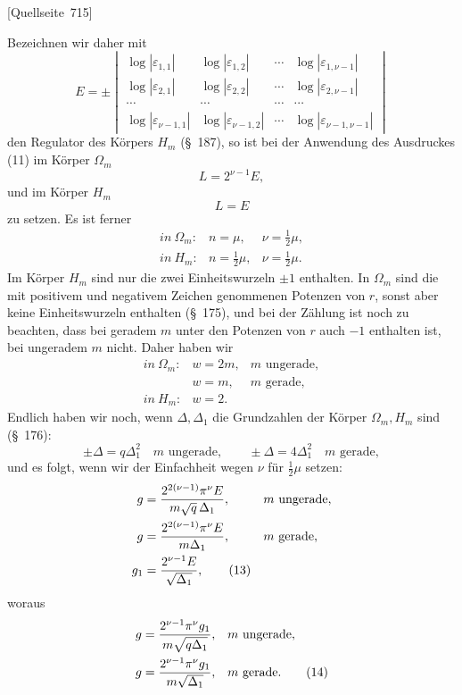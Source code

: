\documentclass[11pt]{article}
\newcommand{\eps}{\varepsilon}
\newcommand{\srcpage}[1]{\par\medskip\noindent\textsf{[Quellseite~#1]}\par\smallskip}
\begin{document}
\srcpage{715}
Bezeichnen wir daher mit
\begin{equation}
E=\pm\begin{vmatrix}
\log|\eps_{1,1}|&\log|\eps_{1,2}|&\cdots&\log|\eps_{1,\nu-1}|\\
\log|\eps_{2,1}|&\log|\eps_{2,2}|&\cdots&\log|\eps_{2,\nu-1}|\\
\cdots&\cdots&\cdots&\cdots\\
\log|\eps_{\nu-1,1}|&\log|\eps_{\nu-1,2}|&\cdots&\log|\eps_{\nu-1,\nu-1}|
\end{vmatrix}
\tag{12}
\end{equation}
den Regulator des Körpers $H_m$ (\S~187), so ist bei der Anwendung des Ausdruckes (11) im Körper $\Omega_m$
\[
L=2^{\nu-1}E,
\]
und im Körper $H_m$
\[
L=E
\]
zu setzen. Es ist ferner
\[
\begin{array}{lll}
in\ \Omega_m: & n=\mu, & \nu=\frac12\mu,\\
in\ H_m: & n=\frac12\mu, & \nu=\frac12\mu.
\end{array}
\]
Im Körper $H_m$ sind nur die zwei Einheitswurzeln $\pm1$ enthalten. In $\Omega_m$ sind die mit positivem und negativem Zeichen genommenen Potenzen von $r$, sonst aber keine Einheitswurzeln enthalten (\S~175), und bei der Zählung ist noch zu beachten, dass bei geradem $m$ unter den Potenzen von $r$ auch $-1$ enthalten ist, bei ungeradem $m$ nicht. Daher haben wir
\[
\begin{array}{lll}
in\ \Omega_m: & w=2m, & m\text{ ungerade},\\
& w=m, & m\text{ gerade},\\
in\ H_m: & w=2.&
\end{array}
\]
Endlich haben wir noch, wenn $\Delta,\Delta_1$ die Grundzahlen der Körper $\Omega_m,H_m$ sind (\S~176):
\[
\pm\Delta=q\Delta_1^2\quad m\text{ ungerade},
\qquad
\pm\Delta=4\Delta_1^2\quad m\text{ gerade},
\]
und es folgt, wenn wir der Einfachheit wegen $\nu$ für $\frac12\mu$ setzen:
\begin{align}
g&=\frac{2^{2(\nu-1)}\pi^\nu E}{m\sqrt q\,\Delta_1}, &&m\text{ ungerade},\notag\\
g&=\frac{2^{2(\nu-1)}\pi^\nu E}{m\Delta_1}, &&m\text{ gerade},\notag\\
g_1&=\frac{2^{\nu-1}E}{\sqrt{\Delta_1}},\tag{13}
\end{align}
woraus
\begin{align}
g&=\frac{2^{\nu-1}\pi^\nu g_1}{m\sqrt{q\Delta_1}}, &&m\text{ ungerade},\notag\\
g&=\frac{2^{\nu-1}\pi^\nu g_1}{m\sqrt{\Delta_1}}, &&m\text{ gerade}.\tag{14}
\end{align}
\end{document}

